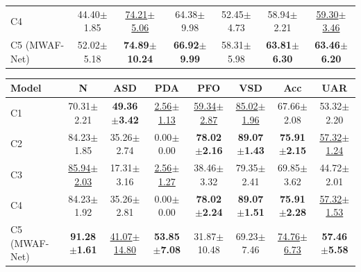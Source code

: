 \begin{table}[H]
\begin{tabular*}{\linewidth}{@{\extracolsep{\fill}}lcccccc@{}}
C4 & 44.40$\pm$1.85 & \underline{74.21$\pm$5.06} & 64.38$\pm$9.98 & 52.45$\pm$4.73 & 58.94$\pm$2.21 & \underline{59.30$\pm$3.46}\\
C5 (MWAF-Net) & 52.02$\pm$5.18 & \textbf{74.89$\pm$10.24} & \textbf{66.92$\pm$9.99} & 58.31$\pm$5.98 & \textbf{63.81$\pm$6.30} & \textbf{63.46$\pm$6.20}\\
\bottomrule\end{tabular*}
\endgroup
{}
\begingroup
\fontsize{8.5}{10}\selectfont
\setlength{\tabcolsep}{4pt}\renewcommand{\arraystretch}{1.04}
\begin{tabular*}{\linewidth}{@{\extracolsep{\fill}}lccccccc@{}}\toprule
\textbf{Model} & \textbf{N} & \textbf{ASD} & \textbf{PDA} & \textbf{PFO} & \textbf{VSD} & \textbf{Acc} & \textbf{UAR}\\\midrule
C1 & 70.31$\pm$2.21 & \textbf{49.36$\pm$3.42} & \underline{2.56$\pm$1.13} & \underline{59.34$\pm$2.87} & \underline{85.02$\pm$1.96} & 67.66$\pm$2.08 & 53.32$\pm$2.20\\
C2 & 84.23$\pm$1.85 & 35.26$\pm$2.74 & 0.00$\pm$0.00 & \textbf{78.02$\pm$2.16} & \textbf{89.07$\pm$1.43} & \textbf{75.91$\pm$2.15} & \underline{57.32$\pm$1.24}\\
C3 & \underline{85.94$\pm$2.03} & 17.31$\pm$3.16 & \underline{2.56$\pm$1.27} & 38.46$\pm$3.32 & 79.35$\pm$2.41 & 69.85$\pm$3.62 & 44.72$\pm$2.01\\
C4 & 84.23$\pm$1.92 & 35.26$\pm$2.81 & 0.00$\pm$0.00 & \textbf{78.02$\pm$2.24} & \textbf{89.07$\pm$1.51} & \textbf{75.91$\pm$2.28} & \underline{57.32$\pm$1.53}\\
C5 (MWAF-Net) & \textbf{91.28$\pm$1.61} & \underline{41.07$\pm$14.80} & \textbf{53.85$\pm$7.08} & 31.87$\pm$10.48 & 69.23$\pm$7.46 & \underline{74.76$\pm$6.73} & \textbf{57.46$\pm$5.58}\\
\bottomrule\end{tabular*}
\endgroup
\end{table}